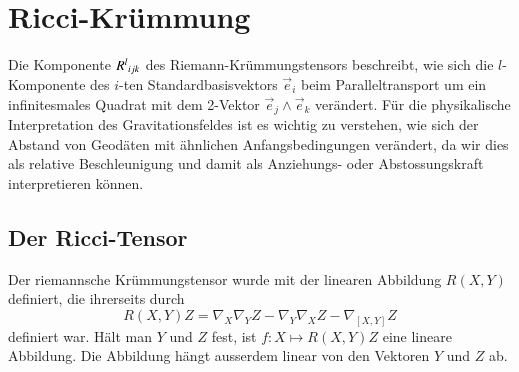 %
%
\section{Ricci-Krümmung
\label{buch:kruemmung:section:ricci}}

Die Komponente $R^l\mathstrut_{ijk}$ des Riemann-Krümmungstensors
beschreibt, wie sich die $l$-Kom\-po\-nen\-te des $i$-ten 
Standardbasisvektors $\vec{e}_i$ beim Paralleltransport um
ein infinitesmales Quadrat mit dem 2-Vektor $\vec{e}_j\wedge \vec{e}_k$
verändert.
Für die physikalische Interpretation des Gravitationsfeldes ist
es wichtig zu verstehen, wie sich der Abstand von Geodäten mit
ähnlichen Anfangsbedingungen verändert, da wir dies als relative
Beschleunigung und damit als Anziehungs- oder Abstossungskraft 
interpretieren können.

%

%
%
\subsection{Der Ricci-Tensor}
Der riemannsche Krümmungstensor wurde mit der linearen Abbildung
$R(X,Y)$ definiert, die ihrerseits durch
\[
R(X,Y)Z
=
\nabla_X\nabla_YZ - \nabla_Y\nabla_XZ-\nabla_{[X,Y]}Z
\]
definiert war.
Hält man $Y$ und $Z$ fest, ist $f:X\mapsto R(X,Y)Z$ eine lineare Abbildung.
Die Abbildung hängt ausserdem linear von den Vektoren $Y$ und $Z$ ab.

